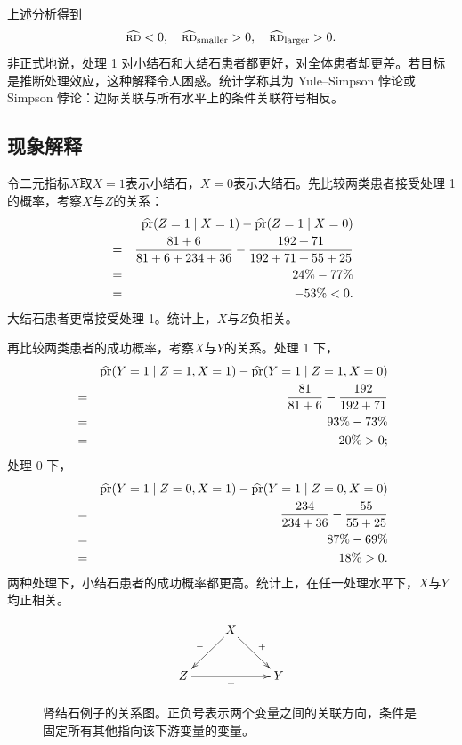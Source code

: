 上述分析得到
$$
\widehat{\textsc{rd}} < 0,\quad
\widehat{\textsc{rd}}_\text{smaller} >0, \quad
\widehat{\textsc{rd}}_\text{larger}  > 0 .
$$
非正式地说，处理 1 对小结石和大结石患者都更好，对全体患者却更差。若目标是推断处理效应，这种解释令人困惑。统计学称其为 Yule--Simpson 悖论或 Simpson 悖论：边际关联与所有水平上的条件关联符号相反。 




\subsection{现象解释}



令二元指标$X$取$X=1$表示小结石，$X=0$表示大结石。先比较两类患者接受处理 1 的概率，考察$X$与$Z$的关系：
\begin{eqnarray*}
&& \widehat{\textup{pr}}(Z=1 \mid  X=1) - \widehat{\textup{pr}}(Z=1 \mid X=0) \\
&=& \frac{81 + 6}{81 + 6 + 234 + 36} - \frac{192+71}{192 + 71 + 55 + 25} \\
&=&  24\% - 77\% \\
&=& - 53\% < 0 .
\end{eqnarray*}
大结石患者更常接受处理 1。统计上，$X$与$Z$负相关。 


再比较两类患者的成功概率，考察$X$与$Y$的关系。处理 1 下，
\begin{eqnarray*}
&& \widehat{\textup{pr}}(Y=1 \mid Z=1,  X=1) - \widehat{\textup{pr}}(Y=1 \mid Z=1,  X=0) \\
&=& \frac{81}{81 + 6} - \frac{192}{192 + 71} \\
&=& 93\% - 73\% \\
&=& 20\%
> 0;
\end{eqnarray*}
处理 0 下，
\begin{eqnarray*}
&& \widehat{\textup{pr}}(Y=1 \mid Z=0, X=1) - \widehat{\textup{pr}}(Y=1 \mid Z=0,   X=0) \\
&=& \frac{234}{234 + 36} - \frac{55}{55 + 25} \\
&=& 87\% - 69\% \\
&=& 18\% 
> 0.
\end{eqnarray*}
两种处理下，小结石患者的成功概率都更高。统计上，在任一处理水平下，$X$与$Y$均正相关。 


\begin{figure}
$$
\xymatrix{
 & X\ar_{-}[ld]\ar^{+}[rd] \\ 
Z \ar_{+}[rr] &&Y 
}
$$
\caption{肾结石例子的关系图。正负号表示两个变量之间的关联方向，条件是固定所有其他指向该下游变量的变量。}\label{fig::kidney-stone}
\end{figure}




